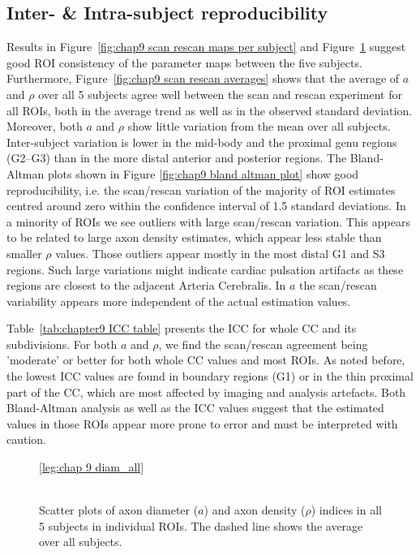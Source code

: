 \subsection{Inter- \& Intra-subject reproducibility}
Results in Figure~\ref{fig:chap9 scan rescan maps per subject} and  Figure~\ref{fig:chap9 scan rescan scatterplots per subject} suggest good \gls{ROI} consistency of the parameter maps between the five subjects. Furthermore, Figure~\ref{fig:chap9 scan rescan averages} shows that the average of $a$ and $\rho$ over all 5 subjects   agree well between the scan and rescan experiment for all ROIs, both in the average trend as well as in the observed standard deviation. Moreover, both $a$ and $\rho$ show little variation from the mean over all subjects. Inter-subject variation is lower in the mid-body and the proximal genu regions (G2--G3) than in the more distal anterior and posterior regions. The Bland-Altman plots shown in Figure \ref{fig:chap9 bland altman plot} show good reproducibility, i.e. the scan/rescan variation of the majority of \gls{ROI} estimates centred around zero within the confidence interval of 1.5 standard deviations. In a minority of \glspl{ROI} we see outliers with large scan/rescan variation. This appears to be related to large axon density estimates, which appear less stable than smaller $\rho$ values. Those outliers appear mostly in the most distal G1 and S3 regions. Such large variations might indicate cardiac pulsation artifacts as these regions are closest to the adjacent Arteria Cerebralis. In $a$ the scan/rescan variability appears more independent of the actual estimation values.


Table~\ref{tab:chapter9 ICC table} presents the \gls{ICC} for whole \gls{CC} and its subdivisions. For both $a$ and $\rho$, we find the scan/rescan agreement being 'moderate' or better for both whole \gls{CC} values and most \gls{ROI}s. As noted before, the lowest ICC values are found in boundary regions (G1) or in the thin proximal part of the \gls{CC}, which are most affected by imaging and analysis artefacts. Both Bland-Altman analysis as well as the ICC values suggest that the estimated values in those \gls{ROI}s appear more prone to error and must be interpreted with caution.

\begin{figure}[ht]
	\centering
	\ref{leg:chap 9 diam_all}
	\\	
	\\
	\caption{Scatter plots of axon diameter ($a$) and axon density ($\rho$) indices in all 5 subjects in individual \gls{ROI}s. The dashed line shows the average over all subjects.}
	\label{fig:chap9 scan rescan scatterplots per subject}
\end{figure}

